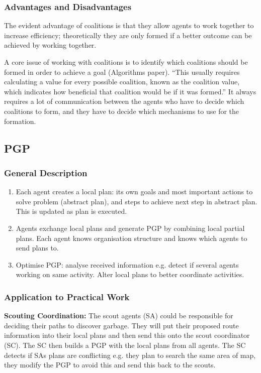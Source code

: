 \subsubsection{Advantages and Disadvantages}

The evident advantage of coalitions is that they allow agents to work together to increase efficiency; theoretically they are only formed if a better outcome can be achieved by working together. 

A core issue of working with coalitions is to identify which coalitions should be formed in order to achieve a goal (Algorithms paper). “This usually requires calculating a value for every possible coalition, known as the coalition value, which indicates how beneficial that coalition would be if it was formed.” It always requires a lot of communication between the agents who have to decide which coalitions to form, and they have to decide which mechanisms to use for the formation.  



\subsection{PGP}

\subsubsection{General Description}

\begin{enumerate}
	\item Each agent creates a local plan: its own goals and most important actions to solve problem (abstract plan), and steps to achieve next step in abstract plan. This is updated as plan is executed.
	\item Agents exchange local plans and generate PGP by combining local partial plans. Each agent knows organisation structure and knows which agents to send plans to.
	\item Optimise PGP: analyse received information e.g. detect if several agents working on same activity. Alter local plans to better coordinate activities.

\end{enumerate}

\subsubsection{Application to Practical Work}

\textbf{Scouting Coordination:} The scout agents (SA) could be responsible for deciding their paths to discover garbage. They will put their proposed route information into their local plans and then send this onto the scout coordinator (SC). The SC then builds a PGP with the local plans from all agents. The SC detects if SAs plans are conflicting e.g. they plan to search the same area of map, they modify the PGP to avoid this and send this back to the scouts. 

